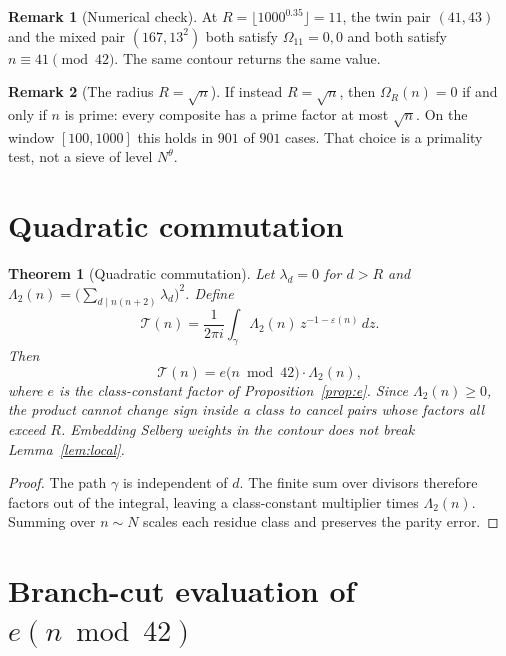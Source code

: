 \documentclass[11pt,a4paper]{article}
\theoremstyle{plain}
\newtheorem{theorem}{Theorem}
\theoremstyle{definition}
\newtheorem{remark}{Remark}
\theoremstyle{plain}
\numberwithin{equation}{section}
\begin{document}
\begin{remark}[Numerical check]
At \(R=\lfloor 1000^{0.35}\rfloor=11\), the twin pair \((41,43)\) and the mixed pair \((167,13^2)\) both satisfy \(\Omega_{11}=0,0\) and both satisfy \(n\equiv 41\pmod{42}\). The same contour returns the same value.
\end{remark}

\begin{remark}[The radius \(R=\sqrt{n}\)]
If instead \(R=\sqrt{n}\), then \(\Omega_R(n)=0\) if and only if \(n\) is prime: every composite has a prime factor at most \(\sqrt{n}\). On the window \([100,1000]\) this holds in \(901\) of \(901\) cases. That choice is a primality test, not a sieve of level \(N^{\theta}\).
\end{remark}

\section{Quadratic commutation}
\label{sec:commute}

\begin{theorem}[Quadratic commutation]
\label{thm:commute}
Let \(\lambda_d=0\) for \(d>R\) and \(\Lambda_2(n)=\bigl(\sum_{d\mid n(n+2)}\lambda_d\bigr)^2\). Define
\begin{equation}
\label{eq:T}
\mathcal{T}(n)=\frac{1}{2\pi i}\int_{\gamma}\Lambda_2(n)\,z^{-1-\varepsilon(n)}\,dz.
\end{equation}
Then
\begin{equation}
\label{eq:factor}
\mathcal{T}(n)=e\bigl(n\bmod 42\bigr)\cdot\Lambda_2(n),
\end{equation}
where \(e\) is the class-constant factor of Proposition~\ref{prop:e}. Since \(\Lambda_2(n)\ge 0\), the product cannot change sign inside a class to cancel pairs whose factors all exceed \(R\). Embedding Selberg weights in the contour does not break Lemma~\ref{lem:local}.
\end{theorem}

\begin{proof}
The path \(\gamma\) is independent of \(d\). The finite sum over divisors therefore factors out of the integral, leaving a class-constant multiplier times \(\Lambda_2(n)\). Summing over \(n\sim N\) scales each residue class and preserves the parity error.
\end{proof}

\section{Branch-cut evaluation of \(e(n\bmod 42)\)}
\label{sec:branch}
\end{document}
